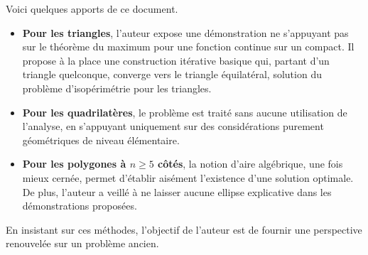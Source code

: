 Voici quelques apports de ce document.

\begin{itemize}
    \item \textbf{Pour les triangles}, l'auteur expose une démonstration ne s'appuyant pas sur le théorème du maximum pour une fonction continue sur un compact. Il propose à la place une construction itérative basique qui, partant d'un triangle quelconque, converge vers le triangle équilatéral, solution du problème d'isopérimétrie pour les triangles.
    
    \item \textbf{Pour les quadrilatères}, le problème est traité sans aucune utilisation de l'analyse, en s'appuyant uniquement sur des considérations purement géométriques de niveau élémentaire.

    \item \textbf{\boldmath Pour les polygones à $n \geq 5$ côtés}, la notion d'aire algébrique, une fois mieux cernée, permet d'établir aisément l'existence d'une solution optimale. De plus, l'auteur a veillé à ne laisser aucune ellipse explicative dans les démonstrations proposées.
\end{itemize}

En insistant sur ces méthodes, l'objectif de l'auteur est de fournir une perspective renouvelée sur un problème ancien.
